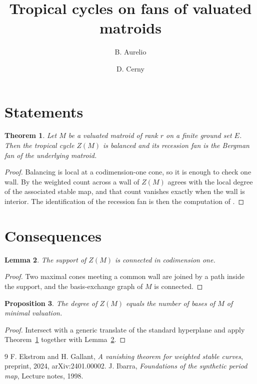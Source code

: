 \documentclass{article}
\title{Tropical cycles on fans of valuated matroids}
\author{B. Aurelio \and D. Cerny}
\newtheorem{theorem}{Theorem}[section]
\newtheorem{lemma}[theorem]{Lemma}
\newtheorem{proposition}[theorem]{Proposition}
\begin{document}
\maketitle

\section{Statements}

\begin{theorem}\label{thm:main}
Let $M$ be a valuated matroid of rank $r$ on a finite ground set $E$. Then the tropical cycle $Z(M)$ is balanced and its recession fan is the Bergman fan of the underlying matroid.
\end{theorem}

\begin{proof}
Balancing is local at a codimension-one cone, so it is enough to check one wall. By \cite[Theorem 1.1]{other} the weighted count across a wall of $Z(M)$ agrees with the local degree of the associated stable map, and that count vanishes exactly when the wall is interior. The identification of the recession fan is then the computation of \cite{third}.
\end{proof}

\section{Consequences}

\begin{lemma}\label{lem:support}
The support of $Z(M)$ is connected in codimension one.
\end{lemma}

\begin{proof}
Two maximal cones meeting a common wall are joined by a path inside the support, and the basis-exchange graph of $M$ is connected.
\end{proof}

\begin{proposition}\label{prop:degree}
The degree of $Z(M)$ equals the number of bases of $M$ of minimal valuation.
\end{proposition}

\begin{proof}
Intersect with a generic translate of the standard hyperplane and apply Theorem~\ref{thm:main} together with Lemma~\ref{lem:support}.
\end{proof}

\begin{thebibliography}{9}
 F. Ekstrom and H. Gallant, \emph{A vanishing theorem for weighted stable curves}, preprint, 2024, arXiv:2401.00002.
 J. Ibarra, \emph{Foundations of the synthetic period map}, Lecture notes, 1998.
\end{thebibliography}
\end{document}

